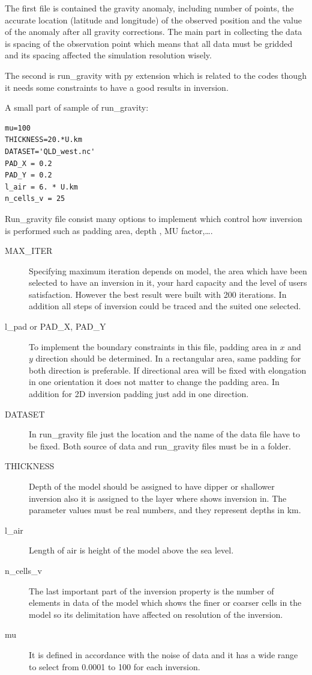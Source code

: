 The first file is contained the gravity anomaly, including number of points, the accurate location
(latitude and longitude) of the observed position and the value of the anomaly after all gravity corrections. 
The main part in collecting the data is spacing of the observation point which means that all data must be gridded and 
its spacing affected the simulation resolution wisely.

The second is run_gravity with py extension which is related to the codes though 
it needs some constraints to have a good results in inversion.

A small part of sample of run_gravity:

\begin{verbatim}
mu=100
THICKNESS=20.*U.km
DATASET='QLD_west.nc'
PAD_X = 0.2
PAD_Y = 0.2
l_air = 6. * U.km
n_cells_v = 25
\end{verbatim}

Run_gravity file consist many options to implement which control how inversion is performed such as padding area, depth , MU factor,\ldots.

\begin{description} 	
\item[MAX\_ITER]
Specifying maximum iteration depends on model, the area which have been selected to have an inversion in it, your hard capacity and the level of users satisfaction. However the best result were built with 200 iterations. In addition all steps of inversion could be traced and the suited one selected.

\item[l_pad or PAD\_X, PAD\_Y] To implement the boundary constraints in this file, padding area in $x$ and $y$ direction should be determined. In a rectangular area, same padding for both direction is preferable. If directional area will be fixed with elongation in one orientation it does not matter to change the padding area. In addition for 2D inversion padding just add in one direction.

\item[DATASET] In run_gravity file just the location and the name of the data file have to be fixed. Both source of data and run_gravity files must be in a folder. 

\item[THICKNESS] Depth of the model should be assigned to have dipper or shallower inversion also it is assigned to the layer where shows inversion in. The parameter values must be real numbers, and they represent depths in km.

\item[l_air] Length of air is height of the model above the sea level. 

\item[n_cells_v] The last important part of the inversion property is the number of elements in data of the model which shows the finer or coarser cells in the model so its delimitation have affected on resolution of the inversion.

\item[mu]It is defined in accordance with the noise of data and it has a wide range to select from 0.0001 to 100 for each inversion.

\end{description}

